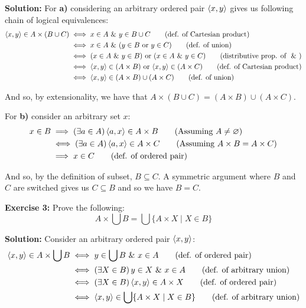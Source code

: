 \documentclass{article}
\begin{document}
\noindent\textbf{Solution:} For \textbf{a)} considering an arbitrary ordered pair $\langle x,y\rangle$ gives us following chain of logical equivalences:
\begin{align*}
    \pair{x}{y}\in A\times(B\cup C)&\iff x\in A\wedge y\in B\cup C\tag{def. of Cartesian product}\\
    &\iff x\in A\wedge (y\in B\vee y\in C)\tag{def. of union}\\
    &\iff (x\in A\wedge y\in B)\vee(x\in A\wedge y\in C)\tag{distributive prop. of $\wedge$}\\
    &\iff \pair{x}{y}\in(A\times B)\vee\pair{x}{y}\in(A\times C)\tag{def. of Cartesian product}\\
    &\iff \pair{x}{y}\in(A\times B)\cup(A\times C)\tag{def. of union}\\
\end{align*}

And so, by extensionality, we have that $A\times(B\cup C)=(A\times B)\cup (A\times C)$.

For \textbf{b)} consider an arbitrary set $x$:
\begin{align*}
    x\in B&\implies(\exists a\in A)\, \langle a,x\rangle\in A\times B\tag{Assuming $A\not=\varnothing$}\\
    &\iff(\exists a\in A)\, \langle a,x\rangle\in A\times C\tag{Assuming $A\times B=A\times C$}\\
    &\implies x\in C\tag{def. of ordered pair}
\end{align*}

And so, by the definition of subset, $B\subseteq C$. A symmetric argument where $B$ and $C$ are switched gives us $C\subseteq B$ and so we have $B=C$.
\bigskip

\noindent\textbf{Exercise 3:} Prove the following:
\begin{equation*}
    A\times\bigcup B=\bigcup\{A\times X\mid X\in B\}
\end{equation*}

\noindent\textbf{Solution:} Consider an arbitrary ordered pair $\langle x,y\rangle$:
\begin{align*}
    \langle x,y\rangle\in A\times\bigcup B&\iff y\in\bigcup B\,\,\&\,\, x\in A\tag{def. of ordered pair}\\
    &\iff (\exists X\in B)\, y\in X\,\,\&\,\, x\in A\tag{def. of arbitrary union}\\
    &\iff (\exists X\in B)\, \langle x,y\rangle\in A\times X\tag{def. of ordered pair}\\
    &\iff \langle x,y\rangle\in\bigcup\{A\times X\mid X\in B\}\tag{def. of arbitrary union}
\end{align*}
\end{document}
